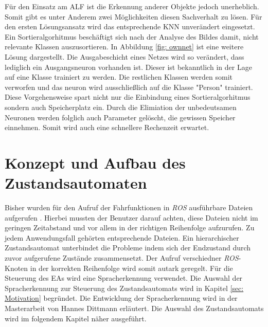 		
		
		Für den Einsatz am ALF ist die Erkennung anderer Objekte jedoch unerheblich. Somit gibt es unter Anderem zwei Möglichkeiten diesen Sachverhalt zu lösen. Für den ersten Lösungsansatz wird das entsprechende KNN unverändert eingesetzt. Ein Sortieralgorhitmus beschäftigt sich nach der Analyse des Bildes damit, nicht relevante Klassen auszusortieren. In Abbildung \ref{fig: ownnet} ist eine weitere Lösung dargestellt. Die Ausgabeschicht eines Netzes wird so verändert, dass lediglich ein Ausgangsneuron vorhanden ist. Dieser ist bekanntlich in der Lage auf eine Klasse trainiert zu werden. Die restlichen Klassen werden somit verworfen und das neuron wird ausschließlich auf die Klasse "Person" trainiert. Diese Vorgehensweise spart nicht nur die Einbindung eines Sortieralgorhitmus sondern auch Speicherplatz ein. Durch die Elimiation der unbedeutsamen Neuronen werden folglich auch Parameter gelöscht, die gewissen Speicher einnehmen. Somit wird auch eine schnellere Rechenzeit erwartet. 
		
	\section{Konzept und Aufbau des Zustandsautomaten}
	\label{sec: Umsetzung der Statemachine}
	Bisher wurden für den Aufruf der Fahrfunktionen in \textit{ROS} ausführbare Dateien aufgerufen \cite{Bachelorarbeit}. Hierbei mussten der Benutzer darauf achten, diese Dateien nicht im geringen Zeitabstand und vor allem in der richtigen Reihenfolge aufzurufen. Zu jedem Anwendungsfall gehörten entsprechende Dateien. Ein hierarchischer Zustandsautomat unterbindet die Probleme indem sich der Endzustand durch zuvor aufgerufene Zustände zusammensetzt. Der Aufruf verschiedner \textit{ROS}-Knoten in der korrekten Reihenfolge wird somit autark geregelt. Für die Steuerung des EAs wird eine Spracherkennung verwendet. Die Auswahl der Spracherkennung zur Steuerung des Zustandsautomats wird in Kapitel \ref{sec: Motivation} begründet. Die Entwicklung der Spracherkennung wird in der Masterarbeit von Hannes Dittmann erläutert. Die Auswahl des Zustandsautomats wird im folgendem Kapitel näher ausgeführt.\\	
	
